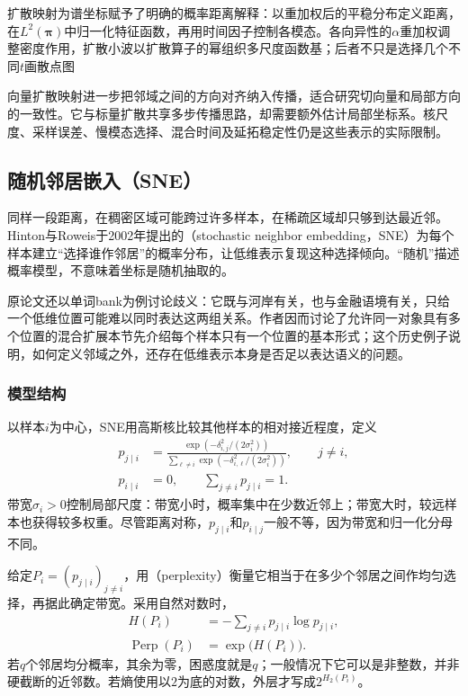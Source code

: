 扩散映射为谱坐标赋予了明确的概率距离解释：以重加权后的平稳分布定义距离，在$L^2(\bm{\pi})$中归一化特征函数，再用时间因子控制各模态。各向异性的$\alpha$重加权调整密度作用，扩散小波以扩散算子的幂组织多尺度函数基；后者不只是选择几个不同$t$画散点图

向量扩散映射进一步把邻域之间的方向对齐纳入传播，适合研究切向量和局部方向的一致性。它与标量扩散共享多步传播思路，却需要额外估计局部坐标系。核尺度、采样误差、慢模态选择、混合时间及延拓稳定性仍是这些表示的实际限制。

\subsection{随机邻居嵌入（SNE）}
\label{sec:dim-sne}

同样一段距离，在稠密区域可能跨过许多样本，在稀疏区域却只够到达最近邻。Hinton与Roweis于2002年提出的（stochastic neighbor embedding，SNE）为每个样本建立“选择谁作邻居”的概率分布，让低维表示复现这种选择倾向。“随机”描述概率模型，不意味着坐标是随机抽取的。

原论文还以单词bank为例讨论歧义：它既与河岸有关，也与金融语境有关，只给一个低维位置可能难以同时表达这两组关系。作者因而讨论了允许同一对象具有多个位置的混合扩展本节先介绍每个样本只有一个位置的基本形式；这个历史例子说明，如何定义邻域之外，还存在低维表示本身是否足以表达语义的问题。

\subsubsection{模型结构}

以样本$i$为中心，SNE用高斯核比较其他样本的相对接近程度，定义
\begin{equation}
  \label{eq:dim-sne-high}
  \begin{aligned}
    p_{j\mid i}
      &=\frac{\exp(-\delta_{i,j}^2/(2\sigma_i^2))}
      {\sum_{\ell\ne i}\exp(-\delta_{i,\ell}^2/(2\sigma_i^2))},
      \qquad j\ne i,\\
    p_{i\mid i}&=0,\qquad \sum_{j\ne i}p_{j\mid i}=1.
  \end{aligned}
\end{equation}
带宽$\sigma_i>0$控制局部尺度：带宽小时，概率集中在少数近邻上；带宽大时，较远样本也获得较多权重。尽管距离对称，$p_{j\mid i}$和$p_{i\mid j}$一般不等，因为带宽和归一化分母不同。

给定$P_i=(p_{j\mid i})_{j\ne i}$，用（perplexity）衡量它相当于在多少个邻居之间作均匀选择，再据此确定带宽。采用自然对数时，
\begin{equation}
  \label{eq:dim-sne-perplexity}
  \begin{aligned}
    H(P_i)&=-\sum_{j\ne i}p_{j\mid i}\log p_{j\mid i},\\
    \operatorname{Perp}(P_i)&=\exp\!\bigl(H(P_i)\bigr).
  \end{aligned}
\end{equation}
若$q$个邻居均分概率，其余为零，困惑度就是$q$；一般情况下它可以是非整数，并非硬截断的近邻数。若熵使用以$2$为底的对数，外层才写成$2^{H_2(P_i)}$。

